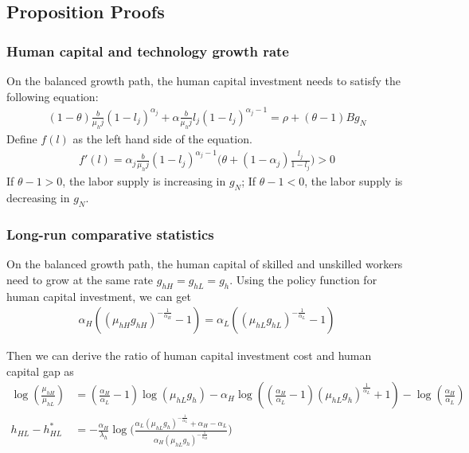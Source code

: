 \documentclass[12pt]{article}
\begin{document}
\begin{appendices}
\section{Proposition Proofs}
 
\subsubsection*{Human capital and technology growth rate}
On the balanced growth path, the human capital investment needs to satisfy the following equation: 
\begin{align*}
(1-\theta)\frac{b}{\mu_hj}(1-l_j)^{\alpha_j}+\alpha\frac{b}{\mu_hj}l_j(1-l_j)^{\alpha_j-1} = \rho+(\theta-1)Bg_N
\end{align*}
Define $f(l)$ as the left hand side of the equation. 
\begin{align*}
f'(l) = \alpha_j\frac{b}{\mu_hj}(1-l_j)^{\alpha_j-1}\big(\theta+(1-\alpha_j)\frac{l_j}{1-l_j}\big)>0
\end{align*}
If $\theta-1>0$, the labor supply is increasing in $g_N$; If $\theta-1<0$, the labor supply is decreasing in $g_N$. 

\subsubsection*{Long-run comparative statistics}
On the balanced growth path, the human capital of skilled and unskilled workers need to grow at the same rate $g_{hH} = g_{hL} = g_h$. Using the policy function for human capital investment, we can get
\begin{align*}
\alpha_H((\mu_{hH}g_{hH})^{-\frac{1}{\alpha_H}}-1) = \alpha_L((\mu_{hL}g_{hL})^{-\frac{1}{\alpha_L}}-1)
\end{align*}

Then we can derive the ratio of human capital investment cost and human capital gap as
\begin{align*}
\log(\frac{\mu_{hH}}{\mu_{hL}}) &= (\frac{\alpha_H}{\alpha_L}-1)\log(\mu_{hL}g_h)-\alpha_H\log((\frac{\alpha_H}{\alpha_L}-1)(\mu_{hL}g_h)^{\frac{1}{\alpha_L}}+1)-\log(\frac{\alpha_H}{\alpha_L}) \\
h_{HL}-h_{HL}^*&= -\frac{\alpha_H}{\lambda_h}\log \Big(\frac{\alpha_L(\mu_{hL}g_h)^{-\frac{1}{\alpha_L}}+\alpha_H-\alpha_L}{\alpha_H(\mu_{hL}g_h)^{-\frac{1}{\alpha_H}}}\Big)
\end{align*}


\end{appendices}
\end{document}
